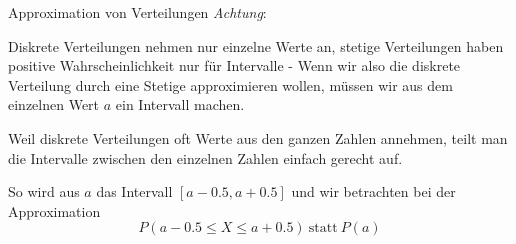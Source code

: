 \begin{algo}{Approximation von Verteilungen}
    \vspace{1em}
    \emph{Achtung}:

    Diskrete Verteilungen nehmen nur einzelne Werte an, stetige Verteilungen haben positive Wahrscheinlichkeit nur für Intervalle - Wenn wir also die diskrete Verteilung durch eine Stetige approximieren wollen, müssen wir aus dem einzelnen Wert $a$ ein Intervall machen.

    Weil diskrete Verteilungen oft Werte aus den ganzen Zahlen annehmen, teilt man die Intervalle zwischen den einzelnen Zahlen einfach gerecht auf.

    So wird aus $a$ das Intervall $[a-0.5,a+0.5]$ und wir betrachten bei der Approximation 
    \[ 
        P(a-0.5 \leq X \leq a+0.5) \ \text{statt} \ P(a)
    \] 
\end{algo}

